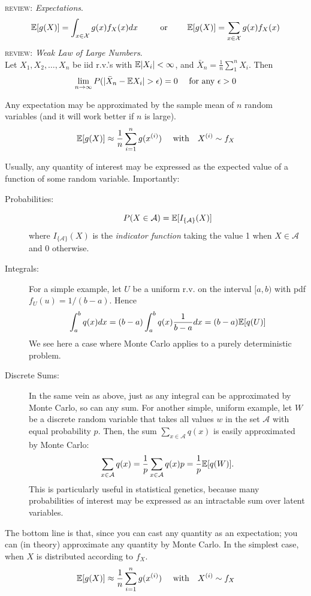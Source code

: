 \textsc{review:} {\sl Expectations}.
\[
\Bbb{E}[g(X)]= \int_{x\in\mathcal{X}} g(x)f_X(x)dx~~~~~~~~
\mathrm{or}~~~~~~~
\Bbb{E}[g(X)] = \sum_{x\in\mathcal{X}} g(x)f_X(x)
\]
\textsc{review:} {\sl Weak Law of Large Numbers}.\\
Let $X_1,X_2,\ldots,X_n$ be iid  r.v.'s with $\Bbb{E}|X_i|<\infty$, and $\bar{X}_n = \frac{1}{n}\sum_{1}^nX_i$.  Then 
\[
\lim_{n\rightarrow\infty} P(|\bar{X}_n - \Bbb{E} X_i| > \epsilon) = 0~~~~\mathrm{for~any}~\epsilon>0 
\]

Any expectation may be approximated by the sample mean of $n$ random variables (and it will work better if $n$ is large).
\[
	\Bbb{E}[g(X)] \approx \frac{1}{n}\sum_{i=1}^n g(x^{(i)})~~~~\mathrm{with}~~~X^{(i)}\sim f_X
\]

Usually, any quantity of interest may be expressed as the expected value of a function of some random variable.  Importantly:
\begin{description}
\item[Probabilities:] 
\[
	P(X\in \mathcal{A}) = \Bbb{E}[ I_{\{\mathcal{A}\}}(X)]
\]
where $I_{\{\mathcal{A}\}}(X)$ is the {\em indicator function} taking the value 1 when $X\in\mathcal{A}$ and 0 otherwise.
\item[Integrals:] For a simple example, let $U$ be a uniform r.v. on the interval $[a,b)$ with pdf $f_U(u) = 1/(b-a)$.  Hence 
\[
	\int_a^b q(x)dx = (b-a)\int_a^b q(x)\frac{1}{b-a}dx = (b-a)\Bbb{E}[q(U)]
\]
We see here a case where Monte Carlo applies to a purely deterministic problem.
\item[Discrete Sums:] In the same vein as above, just as any integral can be approximated by Monte Carlo, so can any sum. For another simple, uniform example, let $W$ be a discrete random variable that takes all values $w$ in the set $\mathcal{A}$ with equal probability $p$. Then, the sum $\sum_{x\in\mathcal{A}}q(x)$ is easily approximated by Monte Carlo:
\[
	\sum_{x\in\mathcal{A}}q(x)  = {\displaystyle\frac{1}{p}  }
	\sum_{x\in\mathcal{A}}q(x)p = 
	{\displaystyle\frac{1}{p}  }
	\Bbb{E}[q(W)].
\]   
This is particularly useful in statistical genetics, because many probabilities of interest may be expressed as an intractable sum over latent variables.
\end{description}

The bottom line is that, since you can cast any quantity as an expectation; you can (in theory) approximate any quantity by Monte Carlo.  In the simplest case, when $X$ is distributed according to $f_X$.  
\[
	\Bbb{E}[g(X)] \approx \frac{1}{n}\sum_{i=1}^n g(x^{(i)})~~~~\mathrm{with}~~~X^{(i)}\sim f_X
\]

